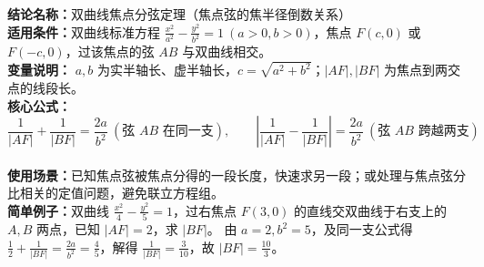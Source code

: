 \textbf{结论名称：}双曲线焦点分弦定理（焦点弦的焦半径倒数关系）\\
\textbf{适用条件：}双曲线标准方程 \(\frac{x^2}{a^2}-\frac{y^2}{b^2}=1\ (a>0,b>0)\)，焦点 \(F(c,0)\) 或 \(F(-c,0)\)，过该焦点的弦 \(AB\) 与双曲线相交。\\
\textbf{变量说明：} \(a,b\) 为实半轴长、虚半轴长，\(c=\sqrt{a^2+b^2}\)；\(|AF|,|BF|\) 为焦点到两交点的线段长。\\
\textbf{核心公式：}
\[
\boxed{\frac{1}{|AF|}+\frac{1}{|BF|}=\frac{2a}{b^2}\ (\text{弦 }AB\text{ 在同一支}),\qquad \left|\frac{1}{|AF|}-\frac{1}{|BF|}\right|=\frac{2a}{b^2}\ (\text{弦 }AB\text{ 跨越两支})}
\]\\
\textbf{使用场景：}已知焦点弦被焦点分得的一段长度，快速求另一段；或处理与焦点弦分比相关的定值问题，避免联立方程组。\\
\textbf{简单例子：}双曲线 \(\frac{x^2}{4}-\frac{y^2}{5}=1\)，过右焦点 \(F(3,0)\) 的直线交双曲线于右支上的 \(A,B\) 两点，已知 \(|AF|=2\)，求 \(|BF|\)。
由 \(a=2,b^2=5\)，及同一支公式得 \(\frac{1}{2}+\frac{1}{|BF|}=\frac{2a}{b^2}=\frac{4}{5}\)，解得 \(\frac{1}{|BF|}=\frac{3}{10}\)，故 \(|BF|=\frac{10}{3}\)。